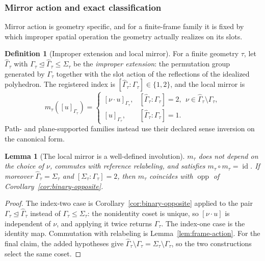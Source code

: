 \documentclass[pdflatex,sn-mathphys-num,referee,lineno]{sn-jnl}
\theoremstyle{plain}
\newtheorem{lemma}[theorem]{Lemma}
\theoremstyle{remark}
\theoremstyle{definition}
\newtheorem{definition}{Definition}
\begin{document}
\subsubsection{Mirror action and exact classification}

Mirror action is geometry specific, and for a finite-frame family it is fixed
by which improper spatial operation the geometry actually realizes on its
slots.

\begin{definition}[Improper extension and local mirror]
\label{def:mirror-local}
For a finite geometry \(\tau\), let \(\widehat\Gamma_\tau\) with
\(\Gamma_\tau\trianglelefteq\widehat\Gamma_\tau\leq\Sigma_\tau\) be the
\emph{improper extension}: the permutation group generated by \(\Gamma_\tau\)
together with the slot action of the reflections of the idealized polyhedron.
The registered index is
\(\left[\widehat\Gamma_\tau:\Gamma_\tau\right]\in\{1,2\}\), and the local
mirror is
\[
  m_\tau\!\left([u]_{\Gamma_\tau}\right)=
  \begin{cases}
    [\nu\cdot u]_{\Gamma_\tau},
      &\left[\widehat\Gamma_\tau:\Gamma_\tau\right]=2,\ \
       \nu\in\widehat\Gamma_\tau\setminus\Gamma_\tau,\\[2pt]
    [u]_{\Gamma_\tau},
      &\left[\widehat\Gamma_\tau:\Gamma_\tau\right]=1 .
  \end{cases}
\]
Path- and plane-supported families instead use their declared sense inversion
on the canonical form.
\end{definition}

\begin{lemma}[The local mirror is a well-defined involution]
\label{lem:mirror-involution}
\(m_\tau\) does not depend on the choice of \(\nu\), commutes with reference
relabeling, and satisfies \(m_\tau\circ m_\tau=\operatorname{id}\).  If
moreover \(\widehat\Gamma_\tau=\Sigma_\tau\) and
\(\left[\Sigma_\tau:\Gamma_\tau\right]=2\), then \(m_\tau\) coincides with
\(\operatorname{opp}\) of Corollary~\ref{cor:binary-opposite}.
\end{lemma}

\begin{proof}
The index-two case is Corollary~\ref{cor:binary-opposite} applied to the pair
\(\Gamma_\tau\trianglelefteq\widehat\Gamma_\tau\) instead of
\(\Gamma_\tau\leq\Sigma_\tau\): the nonidentity coset is unique, so
\([\nu\cdot u]\) is independent of \(\nu\), and applying it twice returns
\(\Gamma_\tau\).  The index-one case is the identity map.  Commutation with
relabeling is Lemma~\ref{lem:frame-action}.  For the final claim, the added
hypotheses give
\(\widehat\Gamma_\tau\setminus\Gamma_\tau=\Sigma_\tau\setminus\Gamma_\tau\),
so the two constructions select the same coset.
\end{proof}
\end{document}
